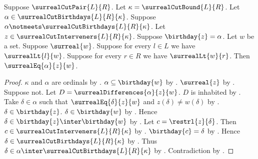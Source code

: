 \begin{lemma}\label{surreal_minimal_intervener_agrees}
    Suppose $\surrealCutPair{L}{R}$.
    Let $\kappa=\surrealCutBound{L}{R}$.
    Let $\alpha\in\surrealCutBirthdays{L}{R}{\kappa}$.
    Suppose $\alpha\notmeets\surrealCutBirthdays{L}{R}{\kappa}$.
    Let $z\in\surrealCutInterveners{L}{R}{\kappa}$.
    Suppose $\birthday{z}=\alpha$.
    Let $w$ be a set.
    Suppose $\surreal{w}$.
    Suppose for every $l\in L$ we have $\surrealLt{l}{w}$.
    Suppose for every $r\in R$ we have $\surrealLt{w}{r}$.
    Then $\surrealEq{\alpha}{z}{w}$.
\end{lemma}
\begin{proof}
    $\kappa$ and $\alpha$ are ordinals
        by .
    $\alpha\subseteq\birthday{w}$
        by .
    $\surreal{z}$
        by .
    Suppose not.
    Let $D=\surrealDifferences{\alpha}{z}{w}$.
    $D$ is inhabited
        by .
    Take $\delta\in\alpha$ such that
        $\surrealEq{\delta}{z}{w}$ and
        $z(\delta)\neq w(\delta)$
        by .
    $\delta\in\birthday{z}$.
    $\delta\in\birthday{w}$ by .
    Hence $\delta\in\birthday{z}\inter\birthday{w}$
        by .
    Let $c=\restrl{z}{\delta}$.
    Then $c\in\surrealCutInterveners{L}{R}{\kappa}$
        by .
    $\birthday{c}=\delta$
        by .
    Hence $\delta\in\surrealCutBirthdays{L}{R}{\kappa}$
        by .
    Thus $\delta\in
        \alpha\inter\surrealCutBirthdays{L}{R}{\kappa}$
        by .
    Contradiction by .
\end{proof}

